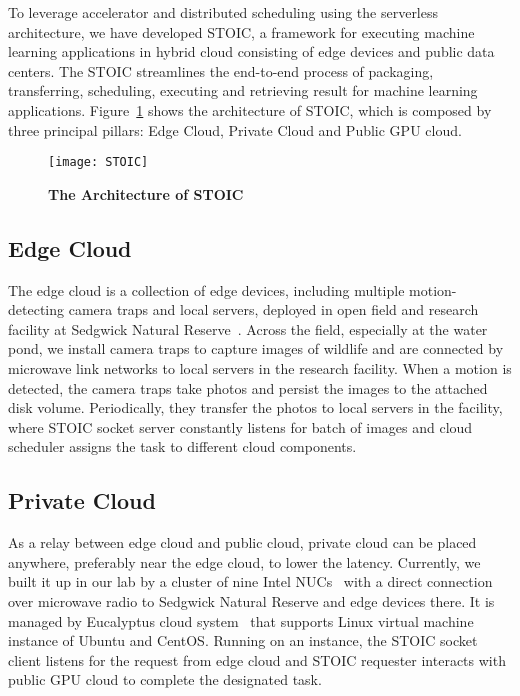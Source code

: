 To leverage accelerator and distributed scheduling using the serverless architecture, we have developed STOIC, a framework for executing machine learning applications in hybrid cloud consisting of edge devices and public data centers. The STOIC streamlines the end-to-end process of packaging, transferring, scheduling, executing and retrieving result for machine learning applications. Figure~\ref{fig:STOIC} shows the architecture of STOIC, which is composed by three principal pillars: Edge Cloud, Private Cloud and Public GPU cloud.

\begin{figure}[t] \centering 
\texttt{[image: STOIC]}
\caption{\textbf{The Architecture of STOIC}}
\label{fig:STOIC}
\end{figure}

\subsection{Edge Cloud}
 The edge cloud is a collection of edge devices, including multiple motion-detecting camera traps and local servers, deployed in open field and research facility at Sedgwick Natural Reserve~\cite{ref:sedgwick}. Across the field, especially at the water pond, we install camera traps to capture images of wildlife and are connected by microwave link networks to local servers in the research facility. When a motion is detected, the camera traps take photos and persist the images to the attached disk volume. Periodically, they transfer the photos to local servers in the facility, where STOIC socket server constantly listens for batch of images and cloud scheduler assigns the task to different cloud components. 
 
 \subsection{Private Cloud}
 
 As a relay between edge cloud and public cloud, private cloud can be placed anywhere, preferably near the edge cloud, to lower the latency. Currently, we built it up in our lab by a cluster of nine Intel NUCs~\cite{ref:nucs} with a direct connection over microwave radio to Sedgwick Natural Reserve and edge devices there. It is managed by Eucalyptus cloud system~\cite{ref:euca} that supports Linux virtual machine instance of Ubuntu and CentOS. Running on an instance, the STOIC socket client listens for the request from edge cloud and STOIC requester interacts with public GPU cloud to complete the designated task.
 
